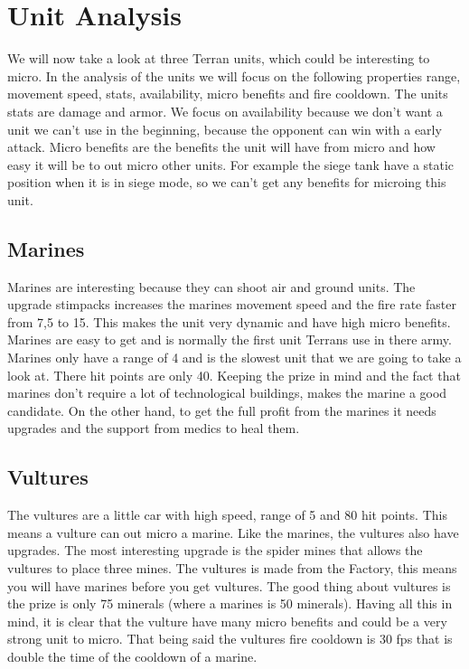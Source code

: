 \section{Unit Analysis}
We will now take a look at three Terran units, which could be interesting to micro. In the analysis of the units we will
focus on the following properties range, movement speed, stats, availability, micro benefits and fire cooldown. The units stats are damage
and armor. We focus on availability because we don't want a unit we can't use in the beginning, because the opponent can
win with a early attack. Micro benefits are the benefits the unit will have from micro and how easy it will be to out micro
other units. For example the siege tank have a static position when it is in siege mode, so we can't get any benefits for microing
this unit. 

\subsection{Marines}
Marines are interesting because they can shoot air and ground units. The upgrade stimpacks increases the marines movement speed and the fire rate
faster from 7,5 to 15. This makes the unit very dynamic and have high micro benefits. Marines are easy to get and is normally the first unit Terrans use in
there army. Marines only have a range of 4 and is the slowest unit that we are going to take a look at. There
hit points are only 40. Keeping the prize in mind and the fact that marines don't require a lot of
technological buildings, makes the marine a good candidate. On the other hand, to get the full profit from the
marines it needs upgrades and the support from medics to heal them. 

\subsection{Vultures}
The vultures are a little car with high speed, range of 5 and 80 hit points. This means a vulture can out micro a marine. Like the marines, the
vultures also have upgrades. The most interesting upgrade is the spider mines that allows the vultures to place three mines. The vultures is made
from the Factory, this means you will have marines before you get vultures. The good thing about vultures is the prize is only 75 minerals (where
a marines is 50 minerals). Having all this in mind, it is clear that the vulture have many micro benefits and could be a very strong unit to micro.
That being said the vultures fire cooldown is 30 fps that is double the time of the cooldown of a marine.

